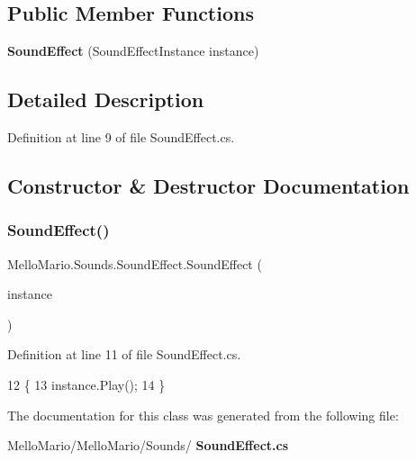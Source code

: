 \subsection*{Public Member Functions}
\begin{DoxyCompactItemize}
\item 
\textbf{ Sound\+Effect} (Sound\+Effect\+Instance instance)
\end{DoxyCompactItemize}


\subsection{Detailed Description}


Definition at line 9 of file Sound\+Effect.\+cs.



\subsection{Constructor \& Destructor Documentation}
\mbox{\label{classMelloMario_1_1Sounds_1_1SoundEffect_a6322447f2b39a03223dcb0e131b722ab}} 
\subsubsection{Sound\+Effect()}
{\footnotesize\ttfamily Mello\+Mario.\+Sounds.\+Sound\+Effect.\+Sound\+Effect (\begin{DoxyParamCaption}\item[{Sound\+Effect\+Instance}]{instance }\end{DoxyParamCaption})}



Definition at line 11 of file Sound\+Effect.\+cs.


\begin{DoxyCode}
12         \{
13             instance.Play();
14         \}
\end{DoxyCode}


The documentation for this class was generated from the following file\+:\begin{DoxyCompactItemize}
\item 
Mello\+Mario/\+Mello\+Mario/\+Sounds/\textbf{ Sound\+Effect.\+cs}\end{DoxyCompactItemize}
